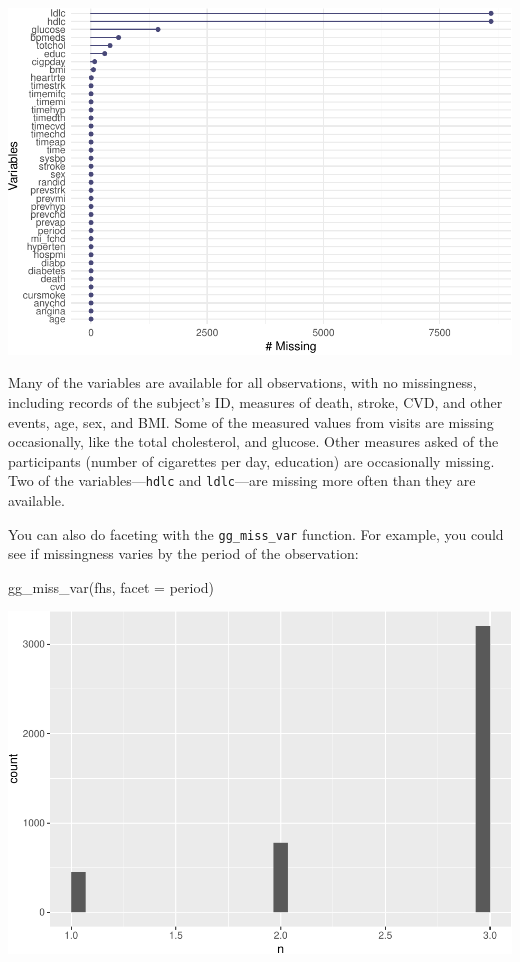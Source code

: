 \documentclass[
]{book}
\newenvironment{Shaded}{\begin{snugshade}}{\end{snugshade}}
\newcommand{\AttributeTok}[1]{\textcolor[rgb]{0.77,0.63,0.00}{#1}}
\newcommand{\FunctionTok}[1]{\textcolor[rgb]{0.00,0.00,0.00}{#1}}
\newcommand{\NormalTok}[1]{#1}
\begin{document}
\includegraphics{adv_epi_analysis_files/figure-latex/unnamed-chunk-171-1.pdf}

Many of the variables are available for all observations, with no missingness,
including records of the subject's ID, measures of death, stroke, CVD, and other
events, age, sex, and BMI. Some of the measured values from visits are missing
occasionally, like the total cholesterol, and glucose. Other measures asked of
the participants (number of cigarettes per day, education) are occasionally
missing. Two of the variables---\texttt{hdlc} and \texttt{ldlc}---are missing more often than
they are available.

You can also do faceting with the \texttt{gg\_miss\_var} function. For
example, you could see if missingness varies by the period of the observation:

\begin{Shaded}
\begin{Highlighting}[]
\FunctionTok{gg\_miss\_var}\NormalTok{(fhs, }\AttributeTok{facet =}\NormalTok{ period)}
\end{Highlighting}
\end{Shaded}

\includegraphics{adv_epi_analysis_files/figure-latex/unnamed-chunk-172-1.pdf}
\end{document}
